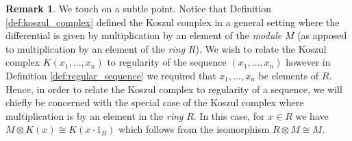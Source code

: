\documentclass[12pt]{article}
\theoremstyle{plain}
\theoremstyle{definition}
\newtheorem{remark}[thm]{Remark}
\begin{document}
	\begin{remark}\label{rmk:where_mult}
		We touch on a subtle point. Notice that Definition \ref{def:koszul_complex} defined the Koszul complex in a general setting where the differential is given by multiplication by an element of the \emph{module} $M$ (as apposed to multiplication by an element of the \emph{ring} $R$). We wish to relate the Koszul complex $K(x_1,...,x_n)$ to regularity of the sequence $(x_1,...,x_n)$ however in Definition \ref{def:regular_sequence} we required that $x_1,...,x_n$ be elements of $R$. Hence, in order to relate the Koszul complex to regularity of a sequence, we will chiefly be concerned with the special case of the Koszul complex where multiplication is by an element in the \emph{ring} $R$. In this case, for $x \in R$ we have $M \otimes K(x) \cong K(x\cdot 1_R)$ which follows from the isomorphism $R \otimes M \cong M$.
	\end{remark}
\end{document}
